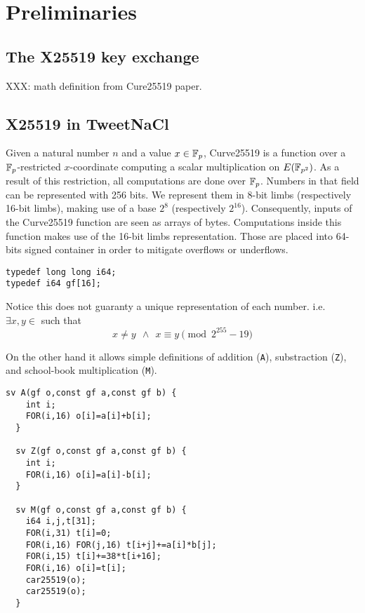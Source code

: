 \section{Preliminaries}

\subsection{The X25519 key exchange}


XXX: math definition from Cure25519 paper.

\subsection{X25519 in TweetNaCl}




Given a natural number $n$ and a value $x \in \mathbb{F}_{p}$, Curve25519 is a function over a $\mathbb{F}_{p}$-restricted
$x$-coordinate computing a scalar multiplication on $E(\mathbb{F}_{p^2})$.
As a result of this restriction, all computations are done over $\mathbb{F}_{p}$.
Numbers in that field can be represented with 256 bits.
We represent them in 8-bit limbs (respectively 16-bit limbs),
making use of a base $2^8$ (respectively $2^{16}$).
Consequently, inputs of the Curve25519 function are seen as arrays of bytes.
Computations inside this function makes use of the 16-bit limbs representation.
Those are placed into 64-bits signed container in order to mitigate overflows or underflows.
\begin{lstlisting}[language=Ctweetnacl]
typedef long long i64;
typedef i64 gf[16];
\end{lstlisting}
Notice this does not guaranty a unique representation of each number. i.e.\\
$\exists x,y \in$  such that
\vspace{-0.25cm}
  $$x \neq y\ \ \land\ \ x \equiv y \pmod{2^{255}-19}$$

  On the other hand it allows simple definitions of addition (\texttt{A}),
  substraction (\texttt{Z}), and school-book multiplication (\texttt{M}).
  \begin{lstlisting}[language=Ctweetnacl]
  sv A(gf o,const gf a,const gf b) {
    int i;
    FOR(i,16) o[i]=a[i]+b[i];
  }

  sv Z(gf o,const gf a,const gf b) {
    int i;
    FOR(i,16) o[i]=a[i]-b[i];
  }

  sv M(gf o,const gf a,const gf b) {
    i64 i,j,t[31];
    FOR(i,31) t[i]=0;
    FOR(i,16) FOR(j,16) t[i+j]+=a[i]*b[j];
    FOR(i,15) t[i]+=38*t[i+16];
    FOR(i,16) o[i]=t[i];
    car25519(o);
    car25519(o);
  }
  \end{lstlisting}

